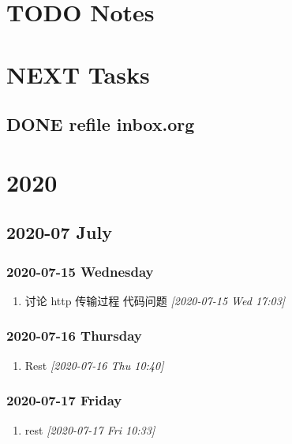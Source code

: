 \documentclass[11pt]{article}
\author{xin}
\date{\today}
\title{}
\begin{document}
\tableofcontents


\section{{\bfseries\sffamily TODO} Notes}
\label{sec:org2e1a81f}
\section{{\bfseries\sffamily NEXT} Tasks}
\label{sec:orgbe3f091}
\subsection{{\bfseries\sffamily DONE} refile inbox.org}
\label{sec:orgd27ad80}
\section{2020}
\label{sec:org83c8208}
\subsection{2020-07 July}
\label{sec:org5520aa6}
\subsubsection{2020-07-15 Wednesday}
\label{sec:orgf74b5a3}
\begin{enumerate}
\item 讨论 http 传输过程
\label{sec:org3f5f0d2}
  代码问题
\textit{[2020-07-15 Wed 17:03]}
\end{enumerate}

\subsubsection{2020-07-16 Thursday}
\label{sec:org126fdde}
\begin{enumerate}
\item Rest
\label{sec:org0770144}
\textit{[2020-07-16 Thu 10:40]}
\end{enumerate}

\subsubsection{2020-07-17 Friday}
\label{sec:orgddd9ab2}
\begin{enumerate}
\item rest
\label{sec:org8da72a8}
\textit{[2020-07-17 Fri 10:33]}
\end{enumerate}
\end{document}
